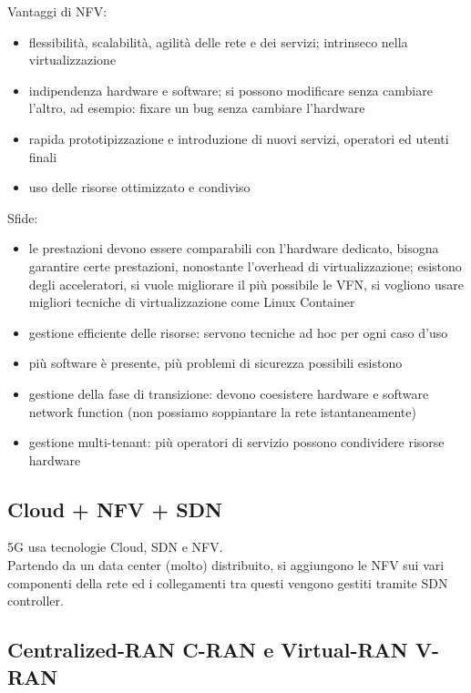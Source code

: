 Vantaggi di NFV: 
\begin{itemize}
	\item flessibilità, scalabilità, agilità delle rete e dei servizi; intrinseco nella virtualizzazione
	\item indipendenza hardware e software; si possono modificare senza cambiare l'altro, ad esempio: fixare un bug senza cambiare l'hardware
	\item rapida prototipizzazione e introduzione di nuovi servizi, operatori ed utenti finali
	\item uso delle risorse ottimizzato e condiviso
\end{itemize}

\newpage

Sfide: 
\begin{itemize}
	\item le prestazioni devono essere comparabili con l'hardware dedicato, bisogna garantire certe prestazioni, nonostante l'overhead di virtualizzazione; esistono degli acceleratori, si vuole migliorare il più possibile le VFN, si vogliono usare migliori tecniche di virtualizzazione come Linux Container
	\item gestione efficiente delle risorse: servono tecniche ad hoc per ogni caso d'uso
	\item più software è presente, più problemi di sicurezza possibili esistono
	\item gestione della fase di transizione: devono coesistere hardware e software network function (non possiamo soppiantare la rete istantaneamente)
	\item gestione multi-tenant: più operatori di servizio possono condividere risorse hardware
\end{itemize}

\subsection*{Cloud + NFV + SDN}

5G usa tecnologie Cloud, SDN e NFV.\\

Partendo da un data center (molto) distribuito, si aggiungono le NFV sui vari componenti della rete ed i collegamenti tra questi vengono gestiti tramite SDN controller.\\

\newpage

\subsection{Centralized-RAN C-RAN e Virtual-RAN V-RAN}

